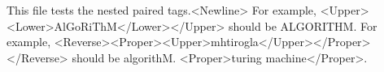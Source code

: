 This file tests the nested paired tags.<Newline>
For example, <Upper><Lower>AlGoRiThM</Lower></Upper> should be ALGORITHM.
For example, <Reverse><Proper><Upper>mhtirogla</Upper></Proper></Reverse> should be algorithM.
<Proper>turing machine</Proper>.
